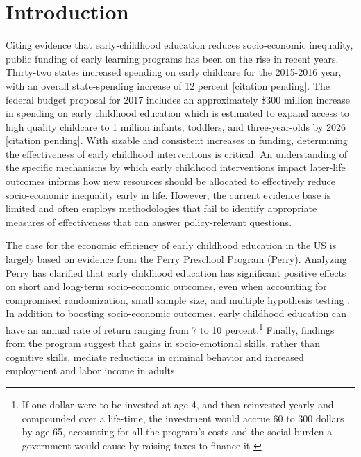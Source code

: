 \singlespacing
\pagebreak
\tableofcontents
\listoffigures
\listoftables
\pagebreak

\section{Introduction}

Citing evidence that early-childhood education reduces socio-economic inequality, public funding of early learning programs has been on the rise in recent years. Thirty-two states increased spending on early childcare for the 2015-2016 year, with an overall state-spending increase of 12 percent [citation pending]. The federal budget proposal for 2017 includes an approximately \$300 million increase in spending on early childhood education which is estimated to expand access to high quality childcare to 1 million infants, toddlers, and three-year-olds by 2026  [citation pending]. With sizable and consistent increases in funding, determining the effectiveness of early childhood interventions is critical. An understanding of the specific mechanisms by which early childhood interventions impact later-life outcomes informs how new resources should be allocated to effectively reduce socio-economic inequality early in life. However, the current evidence base is limited and often employs methodologies that fail to identify appropriate measures of effectiveness that can answer policy-relevant questions. 

The case for the economic efficiency of early childhood education in the US is largely based on evidence from the Perry Preschool Program (Perry). Analyzing Perry has clarified that early childhood education has significant positive effects on short and long-term socio-economic outcomes, even when accounting for compromised randomization, small sample size, and multiple hypothesis testing \citep{Heckman_Moon_etal_2010_QE}. In addition to boosting socio-economic outcomes, early childhood education can have an annual rate of return ranging from 7 to 10 percent.\footnote{If one dollar were to be invested at age 4, and then reinvested yearly and compounded over a life-time, the investment would accrue 60 to 300 dollars by age 65, accounting for all the program's costs and the social burden a government would cause by raising taxes to finance it \citep{Heckman_Moon_etal_2010_RateofReturn}} Finally, findings from the program suggest that gains in socio-emotional skills, rather than cognitive skills, mediate reductions in criminal behavior and increased employment and labor income in adults\citep{Heckman_Pinto_etal_2013_PerryFactor}.

